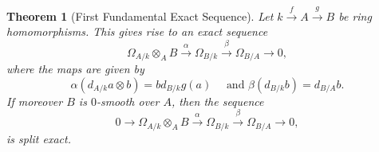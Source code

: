 \documentclass[10pt]{article}
\theoremstyle{thmstyle}
\newtheorem{theorem}{Theorem}[section]
\theoremstyle{defstyle}
\begin{document}
\begin{theorem}[First Fundamental Exact Sequence]
    Let $k\xrightarrow{f} A\xrightarrow{g} B$ be ring homomorphisms. This gives rise to an exact sequence 
    \begin{equation}
        \Omega_{A/k}\otimes_A B\xrightarrow{\alpha} \Omega_{B/k}\xrightarrow{\beta}\Omega_{B/A}\to 0,\label{eq:first-right-exact-sequence}
    \end{equation}
    where the maps are given by 
    \begin{equation*}
        \alpha\left(d_{A/k}a\otimes b\right) = bd_{B/k}g(a)\quad\text{ and }\beta\left(d_{B/k}b\right) = d_{B/A}b.
    \end{equation*}
    If moreover $B$ is $0$-smooth over $A$, then the sequence 
    \begin{equation}
        0\to\Omega_{A/k}\otimes_A B\xrightarrow{\alpha} \Omega_{B/k}\xrightarrow{\beta}\Omega_{B/A}\to 0,\label{eq:first-exact-sequence}
    \end{equation}
    is split exact.
\end{theorem}
\end{document}
